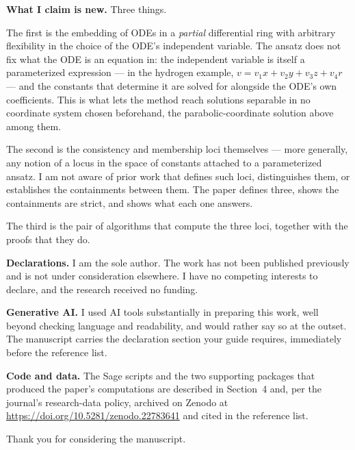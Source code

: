 \documentclass[11pt]{article}
\begin{document}
{\bf What I claim is new.}  Three things.

The first is the embedding of ODEs in a {\it partial} differential ring with
arbitrary flexibility in the choice of the ODE's independent variable.  The
ansatz does not fix what the ODE is an equation in: the independent variable is
itself a parameterized expression --- in the hydrogen example,
$v = v_1 x + v_2 y + v_3 z + v_4 r$ --- and the constants that determine it are
solved for alongside the ODE's own coefficients.  This is what lets the method
reach solutions separable in no coordinate system chosen beforehand, the
parabolic-coordinate solution above among them.

The second is the consistency and membership loci themselves --- more
generally, any notion of a locus in the space of constants attached to a
parameterized ansatz.  I am not aware of prior work that defines such loci,
distinguishes them, or establishes the containments between them.  The paper defines
three, shows the containments are strict, and shows what each one answers.

The third is the pair of algorithms that compute the three loci, together with
the proofs that they do.

{\bf Declarations.}  I am the sole author.  The work has not been published
previously and is not under consideration elsewhere.  I have no competing
interests to declare, and the research received no funding.

{\bf Generative AI.}  I used AI tools substantially in preparing this work, well
beyond checking language and readability, and would rather say so at the outset.
The manuscript carries the declaration section your guide requires, immediately
before the reference list.

{\bf Code and data.}  The Sage scripts and the two supporting packages that
produced the paper's computations are described in Section~4 and, per the
journal's research-data policy, archived on Zenodo at
\url{https://doi.org/10.5281/zenodo.22783641} and cited in the reference list.

Thank you for considering the manuscript.



\end{document}

